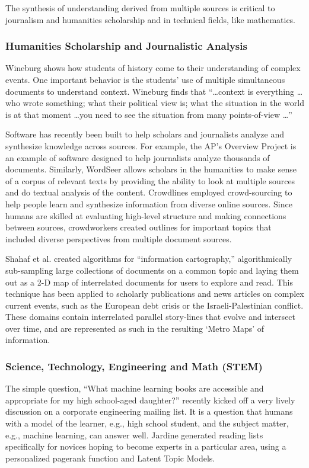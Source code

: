 The synthesis of understanding derived from multiple sources is critical to journalism and humanities scholarship and in technical fields, like mathematics.

\subsubsection{Humanities Scholarship and Journalistic Analysis}  
Wineburg \cite{wineburg} shows how students of history come to their understanding of complex events. One important behavior is the students' use of multiple simultaneous documents to understand context. Wineburg finds that ``\ldots context is everything \ldots who wrote something; what their political view is; what the situation in the world is at that moment \ldots you need to see the situation from many points-of-view \ldots''

Software has recently been built to help scholars and journalists analyze and synthesize knowledge across sources. For example, the AP's Overview Project is an example of software designed to help journalists analyze thousands of documents. Similarly, WordSeer \cite{wordseer} allows scholars in the humanities to make sense of a corpus of relevant texts by providing the ability to look at multiple sources and do textual analysis of the content. Crowdlines \cite{luther} employed crowd-sourcing to help people learn and synthesize information from diverse online sources. Since humans are skilled at evaluating high-level structure and making connections between sources, crowdworkers created outlines for important topics that included diverse perspectives from multiple document sources. 

Shahaf et al. \cite{shahaf} created algorithms for ``information cartography,'' algorithmically sub-sampling large collections of documents on a common topic and laying them out as a 2-D map of interrelated documents for users to explore and read. This technique has been applied to scholarly publications and news articles on complex current events, such as the European debt crisis or the Israeli-Palestinian conflict. These domains contain interrelated parallel story-lines that evolve and intersect over time, and are represented as such in the resulting ‘Metro Maps’ of information.

\subsubsection{Science, Technology, Engineering and Math (STEM)} 
The simple question, ``What machine learning books are accessible and appropriate for my high school-aged daughter?'' recently kicked off a very lively discussion on a corporate engineering mailing list. It is a question that humans with a model of the learner, e.g., high school student, and the subject matter, e.g., machine learning, can answer well. Jardine \cite{jardine} generated reading lists specifically for novices hoping to become experts in a particular area, using a personalized pagerank function and Latent Topic Models. 

